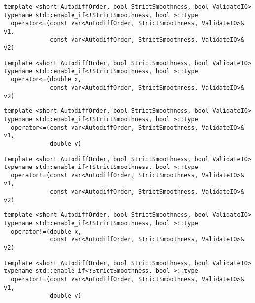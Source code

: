 \begin{tcolorbox}[colback=white,colframe=gray90, coltitle=black,boxrule=3pt,
fonttitle=\bfseries,title= Operator Less Than Or Equal To]

\begin{verbatim}
template <short AutodiffOrder, bool StrictSmoothness, bool ValidateIO>
typename std::enable_if<!StrictSmoothness, bool >::type
  operator<=(const var<AutodiffOrder, StrictSmoothness, ValidateIO>& v1,
             const var<AutodiffOrder, StrictSmoothness, ValidateIO>& v2)

\end{verbatim}

\begin{verbatim}
template <short AutodiffOrder, bool StrictSmoothness, bool ValidateIO>
typename std::enable_if<!StrictSmoothness, bool >::type
  operator<=(double x,
             const var<AutodiffOrder, StrictSmoothness, ValidateIO>& v2)

\end{verbatim}

\begin{verbatim}
template <short AutodiffOrder, bool StrictSmoothness, bool ValidateIO>
typename std::enable_if<!StrictSmoothness, bool >::type
  operator<=(const var<AutodiffOrder, StrictSmoothness, ValidateIO>& v1,
             double y)

\end{verbatim}

\end{tcolorbox}

\begin{tcolorbox}[colback=white,colframe=gray90, coltitle=black,boxrule=3pt,
fonttitle=\bfseries,title= Operator Not Equal To]

\begin{verbatim}
template <short AutodiffOrder, bool StrictSmoothness, bool ValidateIO>
typename std::enable_if<!StrictSmoothness, bool >::type
  operator!=(const var<AutodiffOrder, StrictSmoothness, ValidateIO>& v1,
             const var<AutodiffOrder, StrictSmoothness, ValidateIO>& v2)

\end{verbatim}

\begin{verbatim}
template <short AutodiffOrder, bool StrictSmoothness, bool ValidateIO>
typename std::enable_if<!StrictSmoothness, bool >::type
  operator!=(double x,
             const var<AutodiffOrder, StrictSmoothness, ValidateIO>& v2)

\end{verbatim}

\begin{verbatim}
template <short AutodiffOrder, bool StrictSmoothness, bool ValidateIO>
typename std::enable_if<!StrictSmoothness, bool >::type
  operator!=(const var<AutodiffOrder, StrictSmoothness, ValidateIO>& v1,
             double y)

\end{verbatim}

\end{tcolorbox}

